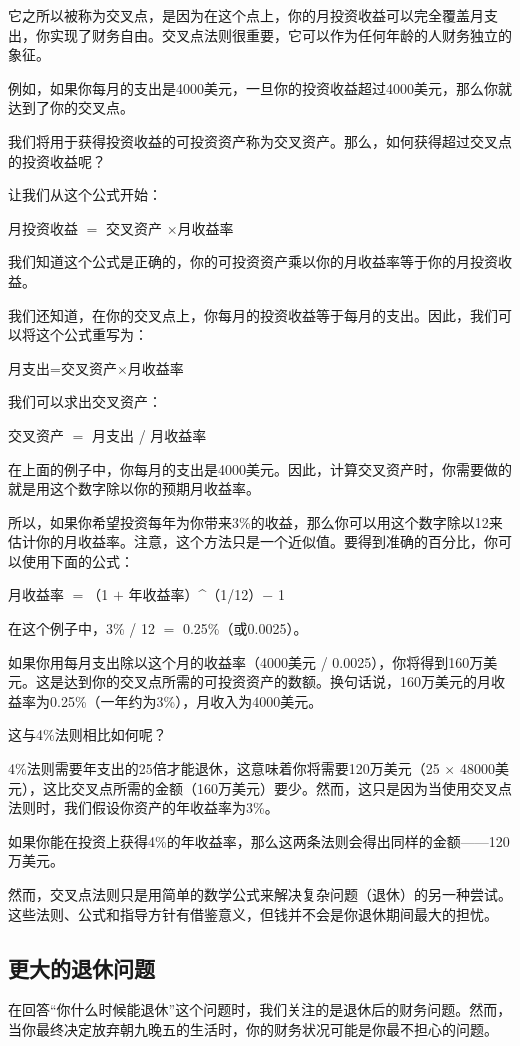 它之所以被称为交叉点，是因为在这个点上，你的月投资收益可以完全覆盖月支出，你实现了财务自由。交叉点法则很重要，它可以作为任何年龄的人财务独立的象征。

例如，如果你每月的支出是4000美元，一旦你的投资收益超过4000美元，那么你就达到了你的交叉点。

我们将用于获得投资收益的可投资资产称为交叉资产。那么，如何获得超过交叉点的投资收益呢？

让我们从这个公式开始：

月投资收益 $=$ 交叉资产 $\times$月收益率

我们知道这个公式是正确的，你的可投资资产乘以你的月收益率等于你的月投资收益。

我们还知道，在你的交叉点上，你每月的投资收益等于每月的支出。因此，我们可以将这个公式重写为：

月支出=交叉资产×月收益率

我们可以求出交叉资产：

交叉资产 $=$ 月支出 / 月收益率

在上面的例子中，你每月的支出是4000美元。因此，计算交叉资产时，你需要做的就是用这个数字除以你的预期月收益率。

所以，如果你希望投资每年为你带来3\%的收益，那么你可以用这个数字除以12来估计你的月收益率。注意，这个方法只是一个近似值。要得到准确的百分比，你可以使用下面的公式：

月收益率 $=$（1 $+$ 年收益率）\textasciicircum{}（1/12）$-$ 1

在这个例子中，3\% / 12 $=$ 0.25\%（或0.0025）。

如果你用每月支出除以这个月的收益率（4000美元 / 0.0025），你将得到160万美元。这是达到你的交叉点所需的可投资资产的数额。换句话说，160万美元的月收益率为0.25\%（一年约为3\%），月收入为4000美元。

这与4\%法则相比如何呢？

4\%法则需要年支出的25倍才能退休，这意味着你将需要120万美元（25 $\times$ 48000美元），这比交叉点所需的金额（160万美元）要少。然而，这只是因为当使用交叉点法则时，我们假设你资产的年收益率为3\%。

如果你能在投资上获得4\%的年收益率，那么这两条法则会得出同样的金额——120万美元。

然而，交叉点法则只是用简单的数学公式来解决复杂问题（退休）的另一种尝试。这些法则、公式和指导方针有借鉴意义，但钱并不会是你退休期间最大的担忧。

\subsection{更大的退休问题}
在回答“你什么时候能退休”这个问题时，我们关注的是退休后的财务问题。然而，当你最终决定放弃朝九晚五的生活时，你的财务状况可能是你最不担心的问题。

